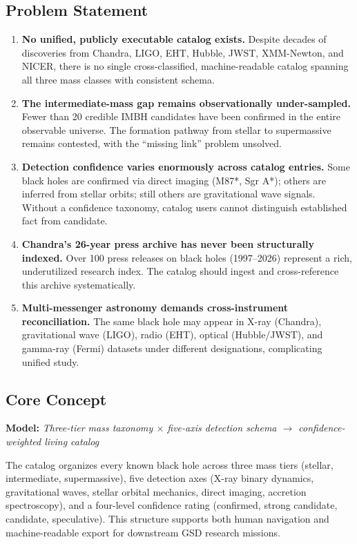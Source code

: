 \documentclass[11pt,letterpaper]{article}
\begin{document}
\subsection{Problem Statement}

\begin{enumerate}
  \item \textbf{No unified, publicly executable catalog exists.} Despite decades of discoveries from Chandra, LIGO, EHT, Hubble, JWST, XMM-Newton, and NICER, there is no single cross-classified, machine-readable catalog spanning all three mass classes with consistent schema.
  \item \textbf{The intermediate-mass gap remains observationally under-sampled.} Fewer than 20 credible IMBH candidates have been confirmed in the entire observable universe. The formation pathway from stellar to supermassive remains contested, with the ``missing link'' problem unsolved.
  \item \textbf{Detection confidence varies enormously across catalog entries.} Some black holes are confirmed via direct imaging (M87*, Sgr A*); others are inferred from stellar orbits; still others are gravitational wave signals. Without a confidence taxonomy, catalog users cannot distinguish established fact from candidate.
  \item \textbf{Chandra's 26-year press archive has never been structurally indexed.} Over 100 press releases on black holes (1997--2026) represent a rich, underutilized research index. The catalog should ingest and cross-reference this archive systematically.
  \item \textbf{Multi-messenger astronomy demands cross-instrument reconciliation.} The same black hole may appear in X-ray (Chandra), gravitational wave (LIGO), radio (EHT), optical (Hubble/JWST), and gamma-ray (Fermi) datasets under different designations, complicating unified study.
\end{enumerate}

\subsection{Core Concept}

\textbf{Model:} \textit{Three-tier mass taxonomy $\times$ five-axis detection schema $\rightarrow$ confidence-weighted living catalog}

The catalog organizes every known black hole across three mass tiers (stellar, intermediate, supermassive), five detection axes (X-ray binary dynamics, gravitational waves, stellar orbital mechanics, direct imaging, accretion spectroscopy), and a four-level confidence rating (confirmed, strong candidate, candidate, speculative). This structure supports both human navigation and machine-readable export for downstream GSD research missions.
\end{document}
